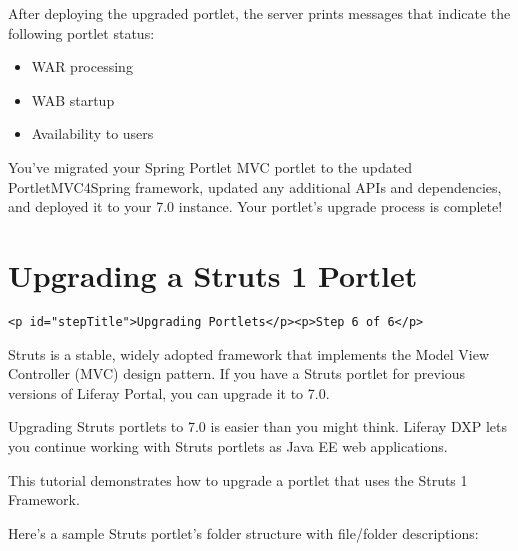 After deploying the upgraded portlet, the server prints messages that
indicate the following portlet status:

\begin{itemize}
\tightlist
\item
  WAR processing
\item
  WAB startup
\item
  Availability to users
\end{itemize}

You've migrated your Spring Portlet MVC portlet to the updated
PortletMVC4Spring framework, updated any additional APIs and
dependencies, and deployed it to your 7.0 instance. Your portlet's
upgrade process is complete!

\chapter{Upgrading a Struts 1
Portlet}\label{upgrading-a-struts-1-portlet}

\begin{verbatim}
<p id="stepTitle">Upgrading Portlets</p><p>Step 6 of 6</p>
\end{verbatim}

Struts is a stable, widely adopted framework that implements the Model
View Controller (MVC) design pattern. If you have a Struts portlet for
previous versions of Liferay Portal, you can upgrade it to 7.0.

Upgrading Struts portlets to 7.0 is easier than you might think. Liferay
DXP lets you continue working with Struts portlets as Java EE web
applications.

This tutorial demonstrates how to upgrade a portlet that uses the Struts
1 Framework.

Here's a sample Struts portlet's folder structure with file/folder
descriptions:


